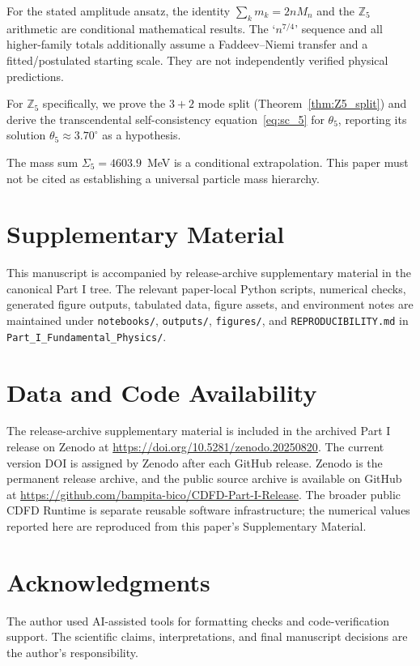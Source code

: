 \documentclass[11pt]{article}
\begin{document}
For the stated amplitude ansatz, the identity $\sum_k m_k=2nM_n$ and the
$\mathbb{Z}_5$ arithmetic are conditional mathematical results. The `$n^{7/4}$'
sequence and all higher-family totals additionally assume a Faddeev--Niemi
transfer and a fitted/postulated starting scale. They are not independently
verified physical predictions.

For $\mathbb{Z}_5$ specifically, we prove the $3 + 2$ mode split
(Theorem~\ref{thm:Z5_split}) and derive the transcendental
self-consistency equation~\eqref{eq:sc_5} for $\theta_5$,
reporting its solution $\theta_5 \approx 3.70^\circ$ as a hypothesis.

The mass sum $\Sigma_5=4603.9$~MeV is a conditional extrapolation. This paper
must not be cited as establishing a universal particle mass hierarchy.


\section*{Supplementary Material}

This manuscript is accompanied by release-archive supplementary material in
the canonical Part I tree. The relevant paper-local Python scripts, numerical checks, generated figure outputs,
tabulated data, figure assets, and environment notes are maintained under
\texttt{notebooks/}, \texttt{outputs/}, \texttt{figures/}, and
\texttt{REPRODUCIBILITY.md} in \texttt{Part\_I\_Fundamental\_Physics/}.


\section*{Data and Code Availability}

The release-archive supplementary material is included in the archived Part I
release on Zenodo at \url{https://doi.org/10.5281/zenodo.20250820}. The current version DOI is assigned by Zenodo after each GitHub release. Zenodo is the
permanent release archive, and the public source archive is available on GitHub at
\url{https://github.com/bampita-bico/CDFD-Part-I-Release}. The broader public CDFD
Runtime is separate reusable software infrastructure; the numerical values reported
here are reproduced from this paper's Supplementary Material.


\section*{Acknowledgments}
The author used AI-assisted tools for formatting checks and code-verification
support. The scientific claims, interpretations, and final manuscript decisions
are the author's responsibility.
\end{document}

